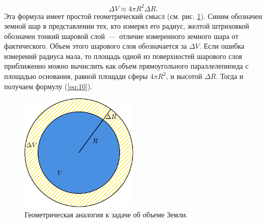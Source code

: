 \documentclass[12pt]{article}
\begin{document}
\begin{equation}\label{eq:10}
 \Delta V \approx 4 \pi R^2\Delta R.
\end{equation}
Эта формула имеет простой геометрический смысл (см. рис. \ref{fig:4}). Синим обозначен земной шар в представлении тех, кто измерял его радиус, желтой штриховкой обозначен тонкий шаровой слой~\----~отличие измеренного земного шара от фактического. Объем этого шарового слоя обозначается за $\Delta V$. Если ошибка измерений радиуса мала, то площадь одной из поверхностей шарового слоя приближенно можно вычислить как объем прямоугольного параллелепипеда с площадью основания, равной площади сферы $4 \pi R^2$, и высотой $\Delta R$. Тогда и получаем формулу (\ref{eq:10}).
\begin{figure}[!ht]
 \centering
 \includegraphics[width=0.5\textwidth]{first3.pdf}
 \caption{Геометрическая аналогия к задаче об объеме Земли.}
 \label{fig:4}
\end{figure}
\end{document}
